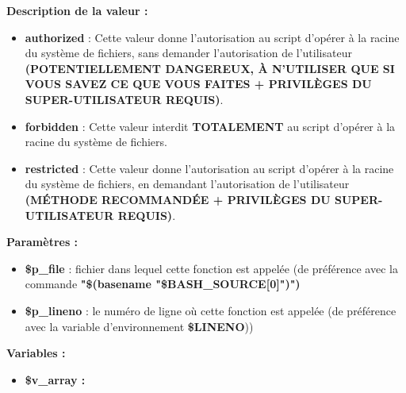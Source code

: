 \documentclass[a4paper,10pt]{article}
\begin{document}
\begin{justify}
    \textbf{Description de la valeur :}

    \begin{itemize}
        \item \textbf{authorized} : Cette valeur donne l'autorisation au script d'opérer à la racine du système de fichiers, sans demander l'autorisation de l'utilisateur \textbf{(\textbf{\color{red}POTENTIELLEMENT DANGEREUX, À N'UTILISER QUE SI VOUS SAVEZ CE QUE VOUS FAITES} + PRIVILÈGES DU SUPER-UTILISATEUR REQUIS)}.\\

        \item \textbf{forbidden} : Cette valeur interdit \textbf{\color{green}TOTALEMENT} au script d'opérer à la racine du système de fichiers.\\

        \item \textbf{restricted} : Cette valeur donne l'autorisation au script d'opérer à la racine du système de fichiers, en demandant l'autorisation de l'utilisateur \textbf{(\textbf{\color{yellow}MÉTHODE RECOMMANDÉE} + PRIVILÈGES DU SUPER-UTILISATEUR REQUIS)}.
    \end{itemize}

\end{justify}

\begin{justify}
    \textbf{Paramètres :}

    \begin{itemize}
        \item \color{orange}\textbf{\$p\_file}\color{white} : fichier dans lequel cette fonction est appelée (de préférence avec la commande \textbf{"\$(\color{gray}basename \color{white}"\color{orange}\$BASH\_SOURCE[0]\color{white}")")}\\

        \item \color{orange}\textbf{\$p\_lineno}\color{white} : le numéro de ligne où cette fonction est appelée (de préférence avec la variable d'environnement \textbf{\color{orange}\$LINENO}))
    \end{itemize}
\end{justify}


\begin{justify}
    \textbf{Variables :}

    \begin{itemize}
        \item \textbf{\color{orange}\$v\_array\color{white} :}
    \end{itemize}
\end{justify}
\end{document}
